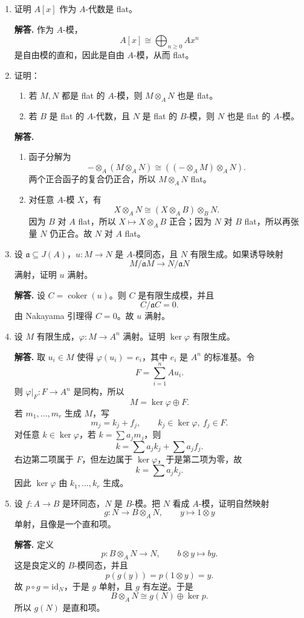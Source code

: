 \documentclass[a4paper]{ctexart}
\begin{document}
\begin{enumerate}[leftmargin=*, label=\textbf{2.\arabic*.}]
\item 证明 \(A[x]\) 作为 \(A\)-代数是 flat。

\textbf{解答.}
作为 \(A\)-模，
\[
A[x]\cong \bigoplus_{n\ge 0} Ax^n
\]
是自由模的直和，因此是自由 \(A\)-模，从而 flat。

\setcounter{enumi}{7}
\item 证明：
\begin{enumerate}[label=(\roman*)]
\item 若 \(M,N\) 都是 flat 的 \(A\)-模，则 \(M\otimes_A N\) 也是 flat。
\item 若 \(B\) 是 flat 的 \(A\)-代数，且 \(N\) 是 flat 的 \(B\)-模，则 \(N\) 也是 flat 的 \(A\)-模。
\end{enumerate}

\textbf{解答.}
\begin{enumerate}[label=(\roman*)]
\item 函子分解为
\[
-\otimes_A (M\otimes_A N)\cong ((-\otimes_A M)\otimes_A N).
\]
两个正合函子的复合仍正合，所以 \(M\otimes_A N\) flat。
\item 对任意 \(A\)-模 \(X\)，有
\[
X\otimes_A N \cong (X\otimes_A B)\otimes_B N.
\]
因为 \(B\) 对 \(A\) flat，所以 \(X\mapsto X\otimes_A B\) 正合；因为 \(N\) 对 \(B\) flat，所以再张量 \(N\) 仍正合。故 \(N\) 对 \(A\) flat。
\end{enumerate}

\setcounter{enumi}{9}
\item 设 \(\mathfrak a\subseteq J(A)\)，\(u:M\to N\) 是 \(A\)-模同态，且 \(N\) 有限生成。如果诱导映射
\[
M/\mathfrak aM \to N/\mathfrak aN
\]
满射，证明 \(u\) 满射。

\textbf{解答.}
设 \(C=\operatorname{coker}(u)\)。则 \(C\) 是有限生成模，并且
\[
C/\mathfrak a C=0.
\]
由 Nakayama 引理得 \(C=0\)。故 \(u\) 满射。

\setcounter{enumi}{11}
\item 设 \(M\) 有限生成，\(\varphi:M\to A^n\) 满射。证明 \(\ker\varphi\) 有限生成。

\textbf{解答.}
取 \(u_i\in M\) 使得 \(\varphi(u_i)=e_i\)，其中 \(e_i\) 是 \(A^n\) 的标准基。令
\[
F=\sum_{i=1}^n Au_i.
\]
则 \(\varphi|_F:F\to A^n\) 是同构，所以
\[
M=\ker\varphi \oplus F.
\]
若 \(m_1,\dots,m_r\) 生成 \(M\)，写
\[
m_j=k_j+f_j,\qquad k_j\in \ker\varphi,\ f_j\in F.
\]
对任意 \(k\in\ker\varphi\)，若 \(k=\sum a_j m_j\)，则
\[
k=\sum a_j k_j + \sum a_j f_j.
\]
右边第二项属于 \(F\)，但左边属于 \(\ker\varphi\)，于是第二项为零，故
\[
k=\sum a_j k_j.
\]
因此 \(\ker\varphi\) 由 \(k_1,\dots,k_r\) 生成。

\setcounter{enumi}{12}
\item 设 \(f:A\to B\) 是环同态，\(N\) 是 \(B\)-模。把 \(N\) 看成 \(A\)-模，证明自然映射
\[
g:N\to B\otimes_A N,\qquad y\mapsto 1\otimes y
\]
单射，且像是一个直和项。

\textbf{解答.}
定义
\[
p:B\otimes_A N\to N,\qquad b\otimes y\mapsto by.
\]
这是良定义的 \(B\)-模同态，并且
\[
p(g(y))=p(1\otimes y)=y.
\]
故 \(p\circ g=\mathrm{id}_N\)，于是 \(g\) 单射，且 \(g\) 有左逆。于是
\[
B\otimes_A N \cong g(N)\oplus \ker p.
\]
所以 \(g(N)\) 是直和项。
\end{enumerate}
\end{document}
